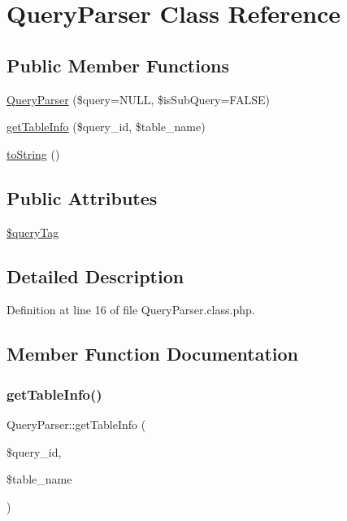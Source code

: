 \hypertarget{classQueryParser}{}\section{Query\+Parser Class Reference}
\label{classQueryParser}
\subsection*{Public Member Functions}
\begin{DoxyCompactItemize}
\item 
\hyperlink{classQueryParser_a4f47d1fe660e953922e2a2e086e9271f}{Query\+Parser} (\$query=N\+U\+LL, \$is\+Sub\+Query=F\+A\+L\+SE)
\item 
\hyperlink{classQueryParser_a4d801af44f4929b30bebfefb81e6ec04}{get\+Table\+Info} (\$query\+\_\+id, \$table\+\_\+name)
\item 
\hyperlink{classQueryParser_aba87968bb8c4ad2167e43fc1ba9ad448}{to\+String} ()
\end{DoxyCompactItemize}
\subsection*{Public Attributes}
\begin{DoxyCompactItemize}
\item 
\hyperlink{classQueryParser_a802feca31cc80049e9d813915280ac85}{\$query\+Tag}
\end{DoxyCompactItemize}


\subsection{Detailed Description}


Definition at line 16 of file Query\+Parser.\+class.\+php.



\subsection{Member Function Documentation}
\mbox{\label{classQueryParser_a4d801af44f4929b30bebfefb81e6ec04}} 
\subsubsection{\texorpdfstring{get\+Table\+Info()}{getTableInfo()}}
{\footnotesize\ttfamily Query\+Parser\+::get\+Table\+Info (\begin{DoxyParamCaption}\item[{}]{\$query\+\_\+id,  }\item[{}]{\$table\+\_\+name }\end{DoxyParamCaption})}

